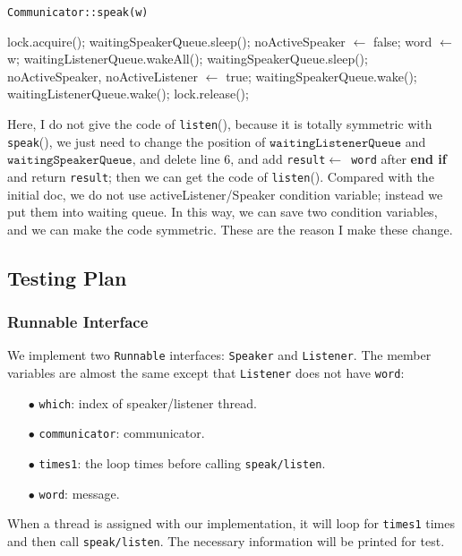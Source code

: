 \documentclass{article}
\begin{document}
\begin{spacing}{1.1}
\begin{algorithm}[htbp]
  \caption{\texttt{Communicator::speak(w)}}
  \begin{algorithmic}[1]
    \STATE lock.acquire();
    \STATE waitingSpeakerQueue.sleep();
    \ENDWHILE
    \STATE noActiveSpeaker $\leftarrow$ false;
    \STATE word $\leftarrow$ w;
    {\color{red}
    \STATE waitingListenerQueue.wakeAll();
    \ELSE
    \STATE waitingSpeakerQueue.sleep();
    \STATE noActiveSpeaker, noActiveListener $\leftarrow$ true;
    \STATE waitingSpeakerQueue.wake();
    \STATE waitingListenerQueue.wake();
    \ENDIF}
    \STATE lock.release();
  \end{algorithmic}
\end{algorithm}
{\color{red} Here, I do not give the code of \texttt{listen}(), because it is totally symmetric with
\texttt{speak}(), we just need to change the position of $\texttt{waitingListenerQueue}$ and 
$\texttt{waitingSpeakerQueue}$, and delete line 6, and add \texttt{result$\leftarrow$ word} after
\textbf{end if} and return \texttt{result}; then we can get the code of \texttt{listen}().
Compared with the initial doc, we do not use activeListener/Speaker condition variable; instead we put them into waiting
queue. In this way, we can save two condition variables, and we can make the code symmetric. These are
the reason I make these change.}

\subsection{Testing Plan}
\subsubsection{Runnable Interface}
We implement two \texttt{Runnable} interfaces: \texttt{Speaker} and \texttt{Listener}. The member variables
are almost the same except that \texttt{Listener} does not have \texttt{word}:
\begin{enumerate}
  \item[$\bullet$] \texttt{which}: index of speaker/listener thread.
  \item[$\bullet$] \texttt{communicator}: communicator.
  \item[$\bullet$] \texttt{times1}: the loop times before calling \texttt{speak/listen}.
  \item[$\bullet$] \texttt{word}: message.
\end{enumerate}
When a thread is assigned with our implementation, it will loop for \texttt{times1} times and then call
\texttt{speak/listen}. The necessary information will be printed for test.

\end{spacing}
\end{document}
